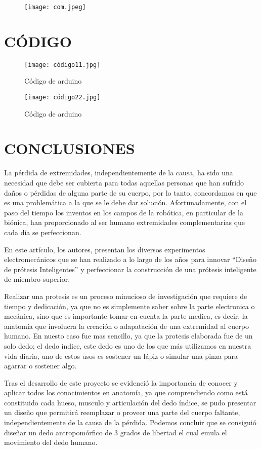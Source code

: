 \documentclass{article}
\begin{document}
\begin{figure} [H]%
    \centering
    \texttt{[image: com.jpeg]} %
    \label{grafica}
\end{figure}
\newpage
\section{CÓDIGO}

\begin{figure} [htp]%
    \centering
    \texttt{[image: código11.jpg]} %
    \caption{Código de arduino}
    \label{grafica}
\end{figure}

\begin{figure} [htp]%
    \centering
    \texttt{[image: código22.jpg]} %
    \caption{Código de arduino}
    \label{grafica}
\end{figure}




\newpage
\section{CONCLUSIONES}
La pérdida de extremidades, independientemente de la causa, ha sido una necesidad que debe ser cubierta para todas aquellas personas que han sufrido daños o pérdidas de alguna parte de su cuerpo,  por lo tanto, concordamos en que es una problemática a la que se le debe dar solución. 
Afortunadamente, con el paso del tiempo los inventos en los campos de la robótica, en particular de la biónica, han proporcionado al ser humano extremidades complementarias que cada día se perfeccionan. 

En este artículo, los autores, presentan los diversos experimentos electromecánicos que se han realizado a lo largo de los años para innovar “Diseño de prótesis Inteligentes” y perfeccionar la construcción de una prótesis inteligente de miembro superior\cite{apastyle2}.

Realizar una protesis es un proceso minucioso de investigación que requiere de tiempo y dedicación, ya que no es simplemente saber sobre la parte electronica o mecánica, sino que es importante tomar en cuenta la parte medica, es decir, la anatomía que involucra la creación o adapatación de una extremidad al cuerpo humano. En nuesto caso fue mas sencillo, ya que la protesis elaborada fue de un solo dedo; el dedo índice, este dedo es uno de los que más utilizamos en nuestra vida diaria, uno de estos usos es sostener un lápiz o simular una pinza para agarrar o sostener algo. 

Tras el desarrollo de este proyecto se evidenció la importancia de conocer y aplicar
todos los conocimientos en anatomía, ya que comprendiendo como está constituido
cada hueso, musculo y articulación del dedo índice, se pudo presentar un diseño que
permitirá reemplazar o proveer una parte del cuerpo faltante, independientemente de
la causa de la pérdida. Podemos concluir que se consiguió diseñar un dedo antropomórfico de 3 grados de libertad el cual emula el
movimiento del dedo humano\cite{apastyle}.

\newpage





\end{document}
